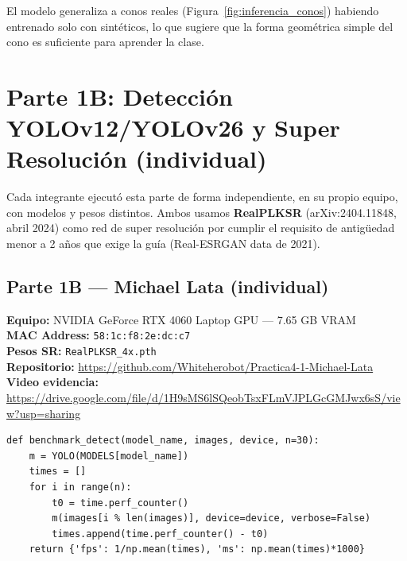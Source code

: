 \documentclass[12pt,a4paper]{article}
\let\oldsubsection\subsection
\renewcommand{\subsection}[1]{\needspace{5\baselineskip}\oldsubsection{#1}}
\begin{document}
El modelo generaliza a conos reales (Figura~\ref{fig:inferencia_conos}) habiendo entrenado solo con sintéticos, lo que sugiere que la forma geométrica simple del cono es suficiente para aprender la clase.

\section{Parte 1B: Detección YOLOv12/YOLOv26 y Super Resolución (individual)}

Cada integrante ejecutó esta parte de forma independiente, en su propio equipo, con modelos y pesos distintos. Ambos usamos \textbf{RealPLKSR} (arXiv:2404.11848, abril 2024) como red de super resolución por cumplir el requisito de antigüedad menor a 2 años que exige la guía (Real-ESRGAN data de 2021).

\subsection{Parte 1B — Michael Lata (individual)}

\begin{michaelbox}
\textbf{Equipo:} NVIDIA GeForce RTX 4060 Laptop GPU — 7.65 GB VRAM\\
\textbf{MAC Address:} \texttt{58:1c:f8:2e:dc:c7}\\
\textbf{Pesos SR:} \texttt{RealPLKSR\_4x.pth}\\
\textbf{Repositorio:} \url{https://github.com/Whiteherobot/Practica4-1-Michael-Lata}\\
\textbf{Video evidencia:} \url{https://drive.google.com/file/d/1H9sMS6lSQeobTsxFLmVJPLGcGMJwx6sS/view?usp=sharing}
\end{michaelbox}

\begin{lstlisting}[style=pystyle]
def benchmark_detect(model_name, images, device, n=30):
    m = YOLO(MODELS[model_name])
    times = []
    for i in range(n):
        t0 = time.perf_counter()
        m(images[i % len(images)], device=device, verbose=False)
        times.append(time.perf_counter() - t0)
    return {'fps': 1/np.mean(times), 'ms': np.mean(times)*1000}
\end{lstlisting}
\end{document}
